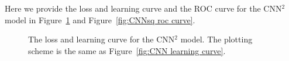 \documentclass[12pt]{article}
\begin{document}
		Here we provide the loss and learning curve and the ROC curve for the CNN$^2$ model in Figure~\ref{fig:CNNsq learning curve} and Figure~\ref{fig:CNNsq roc curve}.
		\begin{figure}[htpb]
			\centering
			\caption{The loss and learning curve for the CNN$^2$ model. The plotting scheme is the same as Figure~\ref{fig:CNN learning curve}.}
			\label{fig:CNNsq learning curve}
		\end{figure}
\end{document}
